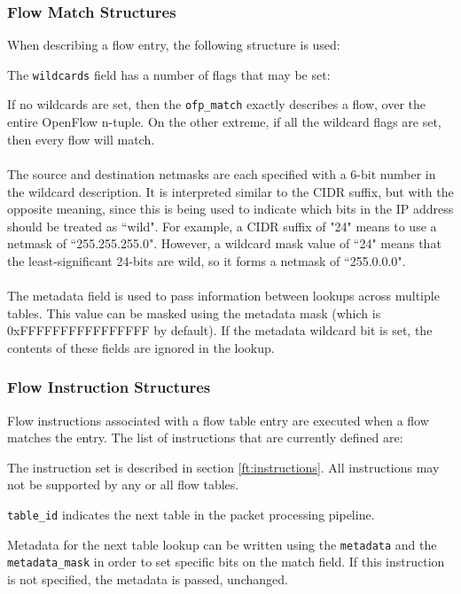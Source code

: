 \subsubsection{Flow Match Structures}
When describing a flow entry, the following structure is used:


The \verb|wildcards| field has a number of flags that may be set:


If no wildcards are set, then the \verb|ofp_match| exactly describes a flow, over the entire OpenFlow n-tuple.  On the other extreme, if all the wildcard flags are set, then every flow will match.
\\\\
The source and destination netmasks are each specified with a 6-bit number in the wildcard description. It is interpreted similar to the CIDR suffix, but with the opposite meaning, since this is being used to indicate which bits in the IP address should be treated as ``wild". For example, a CIDR suffix of "24" means to use a netmask of ``255.255.255.0". However, a wildcard mask value of ``24" means that the least-significant 24-bits are wild, so it forms a netmask of ``255.0.0.0". 
\\\\
The metadata field is used to pass information between lookups across multiple tables. This value can be masked using the metadata mask (which is 0xFFFFFFFFFFFFFFFF by default). If the metadata wildcard bit is set, the contents of these fields are ignored in the lookup.

\subsubsection{Flow Instruction Structures}
Flow instructions associated with a flow table entry are executed when a flow matches the entry. The list of instructions that are currently defined are:


The instruction set is described in section \ref{ft:instructions}. All instructions may not be supported by any or all flow tables.


\verb|table_id| indicates the next table in the packet processing pipeline.


Metadata for the next table lookup can be written using the \verb|metadata| and the \verb|metadata_mask| in order to set specific bits on the match field.   If this instruction is not specified, the metadata is passed, unchanged.

